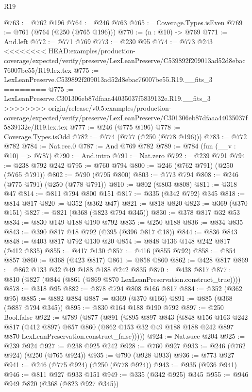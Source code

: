 \begin{lexlean}{R19}
\begin{coremodule}
{{{{{{{{{{{{{{@763 := @762 @196
@764 := @246 @763
@765 := Coverage.Types.isEven
@769 := @761 (@764 (@250 (@765 @196)))
@770 := (n : @10) -> @769
@771 := And.left
@772 := @771 @769
@773 := @230 @95
@774 := @773 @243
<<<<<<<< HEAD:examples/production-coverage/expected/verify/preserve/LexLeanPreserve/C539892f209013ad52d8ebac76007be55/R19.lex.tex
@775 := LexLeanPreserve.C539892f209013ad52d8ebac76007be55.R19.__fits_3
========
@775 := LexLeanPreserve.C301306eb87dfaaa44035037f5839132e.R19.__fits_3
>>>>>>>> origin/release/v0.5:examples/production-coverage/expected/verify/preserve/LexLeanPreserve/C301306eb87dfaaa44035037f5839132e/R19.lex.tex
@777 := @246 (@775 @196)
@778 := Coverage.Types.isOdd
@782 := @774 (@777 (@250 (@778 @196)))
@783 := @772 @782
@784 := Nat.rec.{0}
@787 := And @769 @782
@789 := @784 (fun (__v : @10) => @787)
@790 := And.intro
@791 := Nat.zero
@792 := @239 @791
@794 := @238 @792 @242
@795 := @760 @794
@800 := @246 (@762 @791) (@250 (@765 @791))
@802 := @790 (@795 @800)
@803 := @773 @794
@808 := @246 (@775 @791) (@250 (@778 @791))
@810 := @802 (@803 @808)
@811 := @318 @47
@814 := @811 @794 @800 @151
@817 := @335 (@342 @792) @345
@818 := @814 @817
@820 := @352 (@362 @47)
@821 := @818 @820
@823 := @369 (@370 @151)
@827 := @821 (@368 (@823 @794 @345))
@830 := @378 @817 @32 @53
@834 := @830 @149 @188 @190 @792
@835 := @250 @188
@836 := @834 @835
@843 := @390 @817 @18 @792 (@395 (@396 @817 @18))
@844 := @836 @843
@848 := @403 @817 @792 @130 @20
@854 := @848 @136 @148 @242 @817 (@412 @835)
@855 := @417 @130
@857 := @416 (@855 @792)
@858 := @854 @857
@860 := @368 (@423 @817)
@861 := @858 @860
@862 := @428 @817
@869 := @862 @133 @32 @49 @188 @188 @242 @835
@870 := @438 @817
@877 := @810 (@827 (@844 (@861 (@869 @870 LexLeanPreservation.construct_true))))
@878 := @318 @95
@882 := @878 @794 @808 @166 @817
@884 := @352 (@362 @95)
@885 := @882 @884
@887 := @369 (@370 @166)
@891 := @885 (@368 (@887 @794 @345))
@895 := @830 @164 @188 @190 @792
@897 := @250 Bool.false
@922 := @789
    (@877
      (@891
        (@895
          @897
          @843
          (@848
            @156
            @163
            @242
            @817
            (@412 @897)
            @857
            @860
            (@862 @153 @32 @49 @188 @188 @242 @897 @870 LexLeanPreservation.construct_false)))))
@924 := Nat.succ @204
@925 := @239 @924
@927 := @238 @925 @242
@928 := @760 @927
@933 := @246 (@762 @924) (@250 (@765 @924))
@935 := @790 (@928 @933)
@936 := @773 @927
@941 := @246 (@775 @924) (@250 (@778 @924))
@943 := @935 (@936 @941)
@946 := @811 @927 @933 @151
@949 := @335 (@342 @925) @345
@955 := @946 @949 @820 (@368 (@823 @927 @345))
}}}}}}}}}}}}}}
\end{coremodule}
\end{lexlean}
